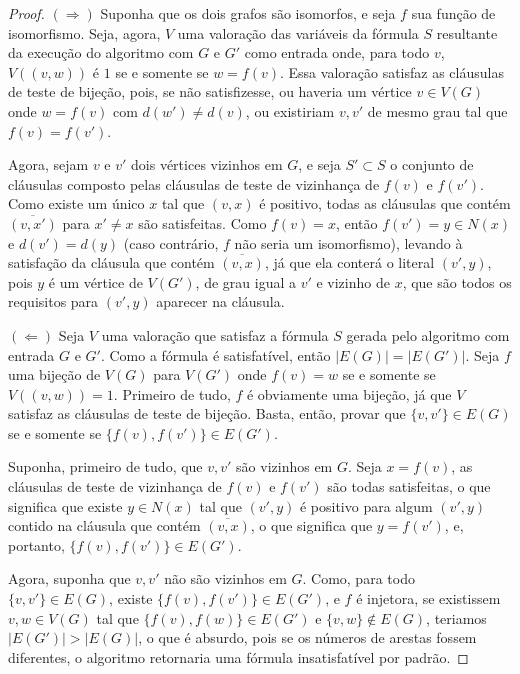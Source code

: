 \documentclass[12pt,a4paper]{article}
\begin{document}
\begin{proof}
\textbf{$(\Rightarrow)$} Suponha que os dois grafos são isomorfos, e seja $f$ sua função de isomorfismo. Seja, agora, $V$ uma valoração
das variáveis da fórmula $S$ resultante da execução do algoritmo com $G$ e $G'$ como entrada onde, para todo $v$, $V((v,w))$ é $1$ se e 
somente se $w=f(v)$. Essa valoração satisfaz as cláusulas de teste de bijeção, pois, se não satisfizesse, ou haveria um vértice 
$v \in V(G)$ onde $w=f(v)$ com $d(w') \neq d(v)$, ou existiriam $v,v'$ de mesmo grau tal que $f(v)=f(v')$.

Agora, sejam $v$ e $v'$ dois vértices vizinhos em $G$, e seja $S' \subset S$ o conjunto de cláusulas composto pelas cláusulas de teste 
de vizinhança de $f(v)$ e $f(v')$. Como existe um único $x$ tal que $(v,x)$ é positivo, todas as cláusulas que contém 
$\overline{(v,x')}$ para $x' \neq x$ são satisfeitas. Como $f(v)=x$, então $f(v')=y \in N(x)$ e $d(v')=d(y)$ (caso contrário, $f$ não 
seria um isomorfismo), levando à satisfação da cláusula que contém $\overline{(v,x)}$, já que ela conterá o literal $(v',y)$, pois $y$ 
é um vértice de $V(G')$, de grau igual a $v'$ e vizinho de $x$, que são todos os requisitos para $(v',y)$ aparecer na cláusula.

\textbf{$(\Leftarrow)$} Seja $V$ uma valoração que satisfaz a fórmula $S$ gerada pelo algoritmo com entrada $G$ e $G'$. Como a fórmula 
é satisfatível, então $|E(G)|=|E(G')|$. Seja $f$ uma bijeção de $V(G)$ para $V(G')$ onde $f(v)=w$ se e somente se $V((v,w))=1$. 
Primeiro de tudo, $f$ é obviamente uma bijeção, já que $V$ satisfaz as cláusulas de teste de bijeção. Basta, então, provar que 
$\{v,v'\} \in E(G)$ se e somente se $\{f(v),f(v')\} \in E(G')$.

Suponha, primeiro de tudo, que $v,v'$ são vizinhos em $G$. Seja $x=f(v)$, as cláusulas de teste de vizinhança de $f(v)$ e $f(v')$ são 
todas satisfeitas, o que significa que existe $y \in N(x)$ tal que $(v',y)$ é positivo para algum $(v',y)$ contido na cláusula
que contém $\overline{(v,x)}$, o que significa que $y=f(v')$, e, portanto, $\{f(v),f(v')\} \in E(G')$.

Agora, suponha que $v,v'$ não são vizinhos em $G$. Como, para todo $\{v,v'\} \in E(G)$, existe $\{f(v),f(v')\} \in E(G')$, e $f$ é 
injetora, se existissem $v,w \in V(G)$ tal que $\{f(v),f(w)\} \in E(G')$ e $\{v,w\} \not\in E(G)$, teriamos $|E(G')|>|E(G)|$,
o que é absurdo, pois se os números de arestas fossem diferentes, o algoritmo retornaria uma fórmula insatisfatível por padrão.
\end{proof}
\end{document}
